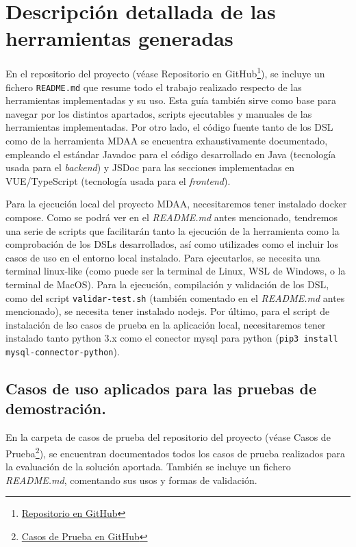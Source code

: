 \section{Descripción detallada de las herramientas generadas}

En el repositorio del proyecto (véase Repositorio en GitHub\footnote{\href{\urlProyecto}{Repositorio en GitHub}}), se incluye un fichero \texttt{README.md} que resume todo el trabajo realizado respecto de las herramientas implementadas y su uso. Esta guía también sirve como base para navegar por los distintos apartados, scripts ejecutables y manuales de las herramientas implementadas. Por otro lado, el código fuente tanto de los DSL como de la herramienta MDAA se encuentra exhaustivamente documentado, empleando el estándar Javadoc para el código desarrollado en Java (tecnología usada para el \textit{backend}) y JSDoc para las secciones implementadas en VUE/TypeScript (tecnología usada para el \textit{frontend}).

Para la ejecución local del proyecto MDAA, necesitaremos tener instalado docker compose. Como se podrá ver en el \textit{README.md} antes mencionado, tendremos una serie de scripts que facilitarán tanto la ejecución de la herramienta como la comprobación de los DSLs desarrollados, así como utilizades como el incluir los casos de uso en el entorno local instalado. Para ejecutarlos, se necesita una terminal linux-like (como puede ser la terminal de Linux, WSL de Windows, o la terminal de MacOS). Para la ejecución, compilación y validación de los DSL, como del script \texttt{validar-test.sh} (también comentado en el \textit{README.md} antes mencionado), se necesita tener instalado nodejs. Por último, para el script de instalación de lso casos de prueba en la aplicación local, necesitaremos tener instalado tanto python 3.x como el conector mysql para python (\texttt{pip3 install mysql-connector-python}).



\subsection{Casos de uso aplicados para las pruebas de demostración.}

En la carpeta de casos de prueba del repositorio del proyecto (véase Casos de Prueba\footnote{\href{\urlProyectoCasosPrueba}{Casos de Prueba en GitHub}}), se encuentran documentados todos los casos de prueba realizados para la evaluación de la solución aportada. También se incluye un fichero \textit{README.md}, comentando sus usos y formas de validación.